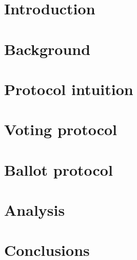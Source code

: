 \documentclass{llncs}
\begin{document}

\setcounter{tocdepth}{3}
\makeatletter
\renewcommand*\l@author[2]{}
\renewcommand*\l@title[2]{}
\makeatletter

\tableofcontents

\newpage


\section{Introduction}
\label{sec:intro}


\section{Background}
\label{sec:background}


\section{Protocol intuition}
\label{sec:protocol-intuition}


\section{Voting protocol}
\label{sec:vocdoni-protocol}


\section{Ballot protocol}
\label{sec:ballot-protocol}


%

\section{Analysis}
\label{sec:analysis}


\section{Conclusions}
\label{sec:conclusions}

\end{document}
